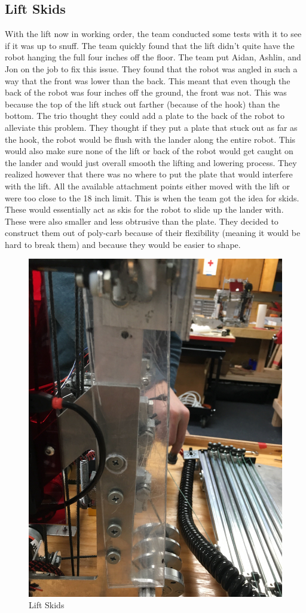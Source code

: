 \documentclass{article}
\begin{document}
\subsection{Lift Skids}
With the lift now in working order, the team conducted some tests with it to see if it was up to snuff. The team quickly found that the lift didn't quite have the robot hanging the full four inches off the floor. The team put Aidan, Ashlin, and Jon on the job to fix this issue. They found that the robot was angled in such a way that the front was lower than the back. This meant that even though the back of the robot was four inches off the ground, the front was not. This was because the top of the lift stuck out farther (because of the hook) than the bottom. The trio thought they could add a plate to the back of the robot to alleviate this problem. They thought if they put a plate that stuck out as far as the hook, the robot would be flush with the lander along the entire robot. This would also make sure none of the lift or back of the robot would get caught on the lander and would just overall smooth the lifting and lowering process. They realized however that there was no where to put the plate that would interfere with the lift. All the available attachment points either moved with the lift or were too close to the 18 inch limit. This is when the team got the idea for skids. These would essentially act as skis for the robot to slide up the lander with. These were also smaller and less obtrusive than the plate. They decided to construct them out of poly-carb because of their flexibility (meaning it would be hard to break them) and because they would be easier to shape.

\begin{figure}
    \centering
    \includegraphics[width=.6 \textwidth]{21_01-21/images/liftskids.JPG}
    \caption{Lift Skids}
    \label{fig:skids}
\end{figure}
\end{document}
